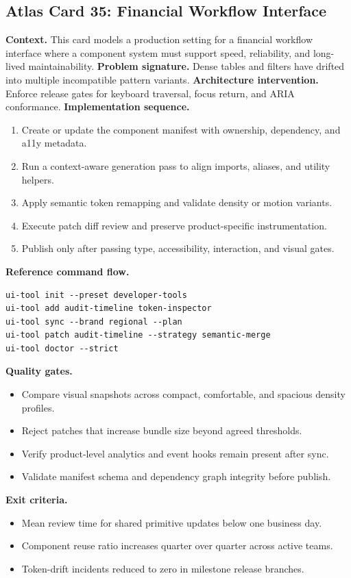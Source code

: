 \subsection*{Atlas Card 35: Financial Workflow Interface}
\textbf{Context.} This card models a production setting for a financial workflow interface where a component system must support speed, reliability, and long-lived maintainability.
\textbf{Problem signature.} Dense tables and filters have drifted into multiple incompatible pattern variants.
\textbf{Architecture intervention.} Enforce release gates for keyboard traversal, focus return, and ARIA conformance.
\textbf{Implementation sequence.}
\begin{enumerate}[leftmargin=*, itemsep=0.28em]
  \item Create or update the component manifest with ownership, dependency, and a11y metadata.
  \item Run a context-aware generation pass to align imports, aliases, and utility helpers.
  \item Apply semantic token remapping and validate density or motion variants.
  \item Execute patch diff review and preserve product-specific instrumentation.
  \item Publish only after passing type, accessibility, interaction, and visual gates.
\end{enumerate}
\textbf{Reference command flow.}
\begin{verbatim}
ui-tool init --preset developer-tools
ui-tool add audit-timeline token-inspector
ui-tool sync --brand regional --plan
ui-tool patch audit-timeline --strategy semantic-merge
ui-tool doctor --strict
\end{verbatim}
\textbf{Quality gates.}
\begin{itemize}[leftmargin=*, itemsep=0.24em]
  \item Compare visual snapshots across compact, comfortable, and spacious density profiles.
  \item Reject patches that increase bundle size beyond agreed thresholds.
  \item Verify product-level analytics and event hooks remain present after sync.
  \item Validate manifest schema and dependency graph integrity before publish.
\end{itemize}
\textbf{Exit criteria.}
\begin{itemize}[leftmargin=*, itemsep=0.24em]
  \item Mean review time for shared primitive updates below one business day.
  \item Component reuse ratio increases quarter over quarter across active teams.
  \item Token-drift incidents reduced to zero in milestone release branches.
\end{itemize}
\clearpage
